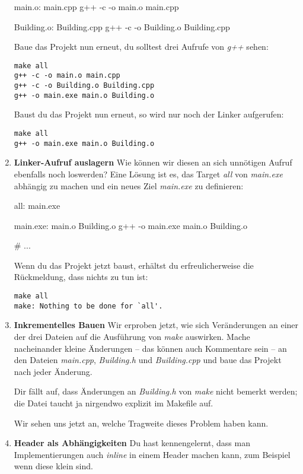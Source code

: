 \begin{enumerate}
\begin{lstmake}
main.o: main.cpp
	g++ -c -o main.o main.cpp

Building.o: Building.cpp
	g++ -c -o Building.o Building.cpp
\end{lstmake}

Baue das Projekt nun erneut, du solltest drei Aufrufe von \emph{g++} sehen:
\begin{verbatim}
make all 
g++ -c -o main.o main.cpp
g++ -c -o Building.o Building.cpp
g++ -o main.exe main.o Building.o
\end{verbatim}
Baust du das Projekt nun erneut, so wird nur noch der Linker aufgerufen:
\begin{verbatim}
make all 
g++ -o main.exe main.o Building.o
\end{verbatim}

\item\textbf{Linker-Aufruf auslagern}
Wie können wir diesen an sich unnötigen Aufruf ebenfalls noch loswerden?
Eine Lösung ist es, das Target \emph{all} von \emph{main.exe} abhängig zu machen und ein neues Ziel \emph{main.exe} zu definieren:
\begin{lstmake}
all: main.exe

main.exe: main.o Building.o
	g++ -o main.exe main.o Building.o

# ...
\end{lstmake}

Wenn du das Projekt jetzt baust, erhältst du erfreulicherweise die Rückmeldung, dass nichts zu tun ist:
\begin{verbatim}
make all 
make: Nothing to be done for `all'.
\end{verbatim}

\item\textbf{Inkrementelles Bauen}
Wir erproben jetzt, wie sich Veränderungen an einer der drei Dateien auf die Ausführung von \emph{make} auswirken.
Mache nacheinander kleine Änderungen -- das können auch Kommentare sein -- an den Dateien \emph{main.cpp}, \emph{Building.h} und \emph{Building.cpp} und baue das Projekt nach jeder Änderung.

Dir fällt auf, dass Änderungen an \emph{Building.h} von \emph{make} nicht bemerkt werden; die Datei taucht ja nirgendwo explizit im Makefile auf.

Wir sehen uns jetzt an, welche Tragweite dieses Problem haben kann.


\item\textbf{Header als Abhängigkeiten}
Du hast kennengelernt, dass man Implementierungen auch \emph{inline} in einem Header machen kann, zum Beispiel wenn diese klein sind.


\end{enumerate}
